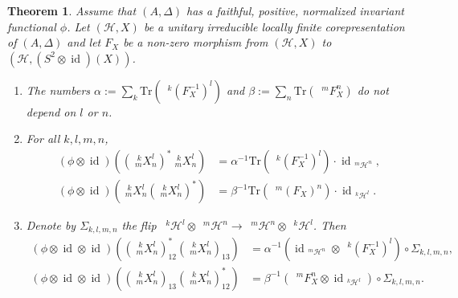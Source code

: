 \documentclass[12pt]{article}
\theoremstyle{change}
\DeclareMathOperator{\id}{id}
\newcommand{\Tr}{\mathrm{Tr}}
\newcommand{\Gr}[5]{\;{}^{\;#2}_{#4}#1_{#5}^{#3}}%
\newcommand{\Gru}[3]{\;{}^{\;#2}#1^{#3}}
\newtheorem{Theorem}{Theorem}[section]
\theoremstyle{definition}
\numberwithin{equation}{section}
\begin{document}
\begin{Theorem} \label{thm:rep-orthogonality} Assume that $(A,\Delta)$
  has a faithful, positive, normalized invariant functional
  $\phi$. Let $(\mathcal{H},X)$ be a unitary irreducible locally
  finite corepresentation of $(A,\Delta)$ and let $F_{X}$ be a
  non-zero morphism from $(\mathcal{H},X)$ to $(\mathcal{H},(S^{2}
  \otimes \id)(X))$.
  \begin{enumerate}
  \item The numbers $\alpha:=\sum_{k} \Tr(\Gru{(F_{X}^{-1})}{k}{l})$
    and $\beta:=\sum_{n} \Tr(\Gru{F_{X}}{m}{n})$ do not depend on $l$
    or $n$.
  \item  For all $k,l,m,n$,
    \begin{align*}
      (\phi \otimes \id)((\Gr{X}{k}{l}{m}{n})^{*}\Gr{X}{k}{l}{m}{n})
      &=\alpha^{-1}{\Tr(\Gru{(F^{-1}_{X})}{k}{l})} \cdot
      \id_{\Gru{\mathcal{H}}{m}{n}}, \\
      (\phi \otimes \id)(\Gr{X}{k}{l}{m}{n}(\Gr{X}{k}{l}{m}{n})^{*})
      &=\beta^{-1}{\Tr( \Gru{(F_{X})}{m}{n})} \cdot
      \id_{\Gru{\mathcal{H}}{k}{l}}.
    \end{align*}
  \item Denote by $\Sigma_{k,l,m,n}$ the flip $\Gru{\mathcal{H}}{k}{l}
    \otimes \Gru{\mathcal{H}}{m}{n} \to \Gru{\mathcal{H}}{m}{n}
    \otimes \Gru{\mathcal{H}}{k}{l}$. Then
 \begin{align*}
   (\phi \otimes \id \otimes
   \id)((\Gr{X}{k}{l}{m}{n})_{12}^{*}(\Gr{X}{k}{l}{m}{n})_{13}) &=
   \alpha^{-1}
   (\id_{\Gru{\mathcal{H}}{m}{n}} \otimes \Gru{(F_{X}^{-1})}{k}{l})
   \circ \Sigma_{k,l,m,n}, \\
   (\phi \otimes \id \otimes
   \id)((\Gr{X}{k}{l}{m}{n})_{13}(\Gr{X}{k}{l}{m}{n})_{12}^{*}) &= \beta^{-1} (\Gru{F_{X}}{m}{n}
   \otimes \id_{\Gru{\mathcal{H}}{k}{l}}) \circ \Sigma_{k,l,m,n}.
 \end{align*}
\end{enumerate}
  \end{Theorem}
\end{document}
